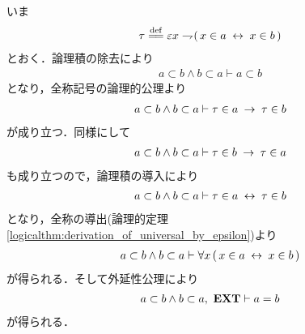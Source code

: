 	\begin{sketch}
		いま
		\begin{align}
			\tau \defeq \varepsilon x \negation (\, x \in a \lrarrow x \in b\, )
		\end{align}
		とおく．論理積の除去により
		\begin{align}
			a \subset b \wedge b \subset a \vdash a \subset b
		\end{align}
		となり，全称記号の論理的公理より
		\begin{align}
			a \subset b \wedge b \subset a \vdash \tau \in a \hspace{0.25em}\rightarrow\hspace{0.25em} \tau \in b
		\end{align}
		が成り立つ．同様にして
		\begin{align}
			a \subset b \wedge b \subset a \vdash \tau \in b \hspace{0.25em}\rightarrow\hspace{0.25em} \tau \in a
		\end{align}
		も成り立つので，論理積の導入により
		\begin{align}
			a \subset b \wedge b \subset a \vdash \tau \in a \hspace{0.25em}\leftrightarrow\hspace{0.25em} \tau \in b
		\end{align}
		となり，全称の導出(論理的定理\ref{logicalthm:derivation_of_universal_by_epsilon})より
		\begin{align}
			a \subset b \wedge b \subset a \vdash 
			\forall x\, (\, x \in a \hspace{0.25em}\leftrightarrow\hspace{0.25em} x \in b\, )
		\end{align}
		が得られる．そして外延性公理により
		\begin{align}
			a \subset b \wedge b \subset a,\ \mbox{{\bf EXT}} \vdash a = b 
		\end{align}
		が得られる．
		\QED
	\end{sketch}
	
	
